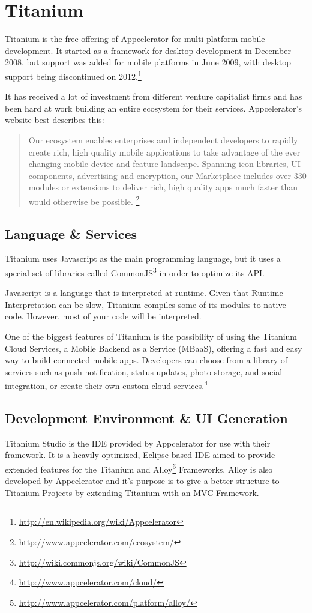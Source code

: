 \section{Titanium}
Titanium is the free offering of Appcelerator for multi-platform mobile development. It started as a framework for desktop development in December 2008, but support was added for mobile platforms in June 2009, with desktop support being discontinued on 2012.\footnote{\url{http://en.wikipedia.org/wiki/Appcelerator}}

It has received a lot of investment from different venture capitalist firms and has been hard at work building an entire ecosystem for their services. Appcelerator's website best describes this:
\begin{quotation}
Our ecosystem enables enterprises and independent developers to rapidly create rich, high quality mobile applications to take advantage of the ever changing mobile device and feature landscape.
Spanning icon libraries, UI components, advertising and encryption, our Marketplace includes over 330 modules or extensions to deliver rich, high quality apps much faster than would otherwise be possible.
\footnote{\url{http://www.appcelerator.com/ecosystem/}}
\end{quotation}
 

\subsection{Language \& Services}
Titanium uses Javascript as the main programming language, but it uses a special set of libraries called CommonJS\footnote{\url{http://wiki.commonjs.org/wiki/CommonJS}} in order to optimize its \ac{API}.

Javascript is a language that is interpreted at runtime. Given that Runtime Interpretation can be slow, Titanium compiles some of its modules to native code. However, most of your code will be interpreted.

One of the biggest features of Titanium is the possibility of using the Titanium Cloud Services, a Mobile Backend as a Service (MBaaS), offering a fast and easy way to build connected mobile apps. Developers can choose from a library of services such as push notification, status updates, photo storage, and social integration, or create their own custom cloud services.\footnote{\url{http://www.appcelerator.com/cloud/}} 



\subsection{Development Environment \& UI Generation}
Titanium Studio is the \ac{IDE} provided by Appcelerator for use with their framework. It is a heavily optimized, Eclipse based \ac{IDE} aimed to provide extended features for the Titanium and Alloy\footnote{\url{http://www.appcelerator.com/platform/alloy/}} Frameworks. Alloy is also developed by Appcelerator and it's purpose is to give a better structure to Titanium Projects by extending Titanium with an \ac{MVC} Framework.

